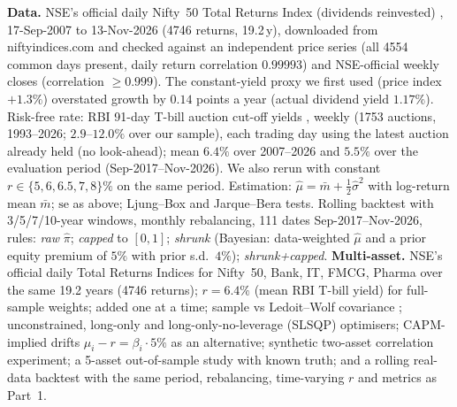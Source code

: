 \documentclass[10pt,a4paper]{article}
\begin{document}
\textbf{Data.} NSE's official daily Nifty~50 Total Returns Index (dividends reinvested) \cite{nifty}, 17-Sep-2007 to 13-Nov-2026 (4746 returns, 19.2\,y), downloaded from niftyindices.com and checked against an independent price series (all 4554 common days present, daily return correlation $0.99993$) and NSE-official weekly closes \cite{tapetide} (correlation $\ge0.999$). The constant-yield proxy we first used (price index $+1.3\%$) overstated growth by $0.14$ points a year (actual dividend yield $1.17\%$). Risk-free rate: RBI 91-day T-bill auction cut-off yields \cite{rbi}, weekly (1753 auctions, 1993--2026; $2.9$--$12.0\%$ over our sample), each trading day using the latest auction already held (no look-ahead); mean $6.4\%$ over 2007--2026 and $5.5\%$ over the evaluation period (Sep-2017--Nov-2026). We also rerun with constant $r\in\{5,6,6.5,7,8\}\%$ on the same period. Estimation: $\hat\mu=\bar m+\tfrac12\hat\sigma^2$ with log-return mean $\bar m$; $\mathrm{se}$ as above; Ljung--Box and Jarque--Bera tests. Rolling backtest with 3/5/7/10-year windows, monthly rebalancing, 111 dates Sep-2017--Nov-2026, rules: \emph{raw} $\hat\pi$; \emph{capped} to $[0,1]$; \emph{shrunk} (Bayesian: data-weighted $\hat\mu$ and a prior equity premium of $5\%$ with prior s.d.\ $4\%$); \emph{shrunk+capped}.
\textbf{Multi-asset.} NSE's official daily Total Returns Indices for Nifty~50, Bank, IT, FMCG, Pharma over the same 19.2 years (4746 returns); $r=6.4\%$ (mean RBI T-bill yield) for full-sample weights; added one at a time; sample vs Ledoit--Wolf covariance \cite{lw}; unconstrained, long-only and long-only-no-leverage (SLSQP) optimisers; CAPM-implied drifts $\mu_i-r=\beta_i\cdot5\%$ as an alternative; synthetic two-asset correlation experiment; a 5-asset out-of-sample study with known truth; and a rolling real-data backtest with the same period, rebalancing, time-varying $r$ and metrics as Part~1.
\end{document}
